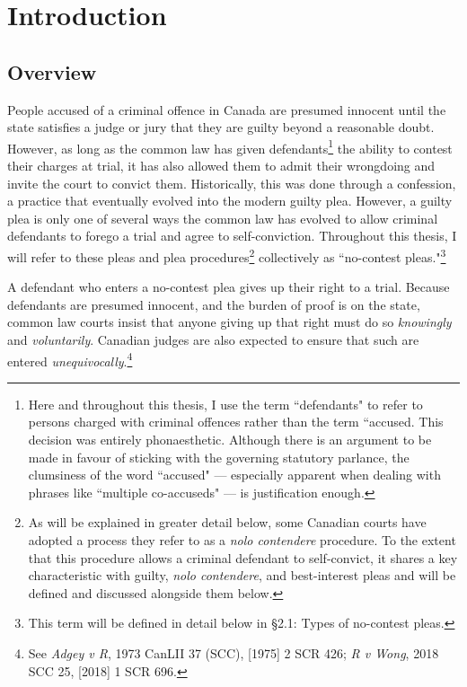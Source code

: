 \chapter{Introduction}

\section{Overview}

People accused of a criminal offence in Canada are presumed innocent until the state satisfies a judge or jury that they are guilty beyond a reasonable doubt. However, as long as the common law has given defendants\footnote{Here and throughout this thesis, I use the term ``defendants" to refer to persons charged with criminal offences rather than the term ``accused. This decision was entirely phonaesthetic. Although there is an argument to be made in favour of sticking with the governing statutory parlance, the clumsiness of the word ``accused" — especially apparent when dealing with phrases like ``multiple co-accuseds" — is justification enough.} the ability to contest their charges at trial, it has also allowed them to admit their wrongdoing and invite the court to convict them. Historically, this was done through a confession, a practice that eventually evolved into the modern guilty plea. However, a guilty plea is only one of several ways the common law has evolved to allow criminal defendants to forego a trial and agree to self-conviction. Throughout this thesis, I will refer to these pleas and plea procedures\footnote{As will be explained in greater detail below, some Canadian courts have adopted a process they refer to as a \textit{nolo contendere} procedure. To the extent that this procedure allows a criminal defendant to self-convict, it shares a key characteristic with guilty, \textit{nolo contendere}, and best-interest pleas and will be defined and discussed alongside them below.} collectively as ``no-contest pleas."\footnote{This term will be defined in detail below in §2.1: Types of no-contest pleas.} 

A defendant who enters a no-contest plea gives up their right to a trial. Because defendants are presumed innocent, and the burden of proof is on the state, common law courts insist that anyone giving up that right must do so \textit{knowingly} and \textit{voluntarily}. Canadian judges are also expected to ensure that such are entered \textit{unequivocally}.\footnote{See \textit{Adgey v R}, 1973 CanLII 37 (SCC), [1975] 2 SCR 426; \textit{R v Wong}, 2018 SCC 25, [2018] 1 SCR 696.}

